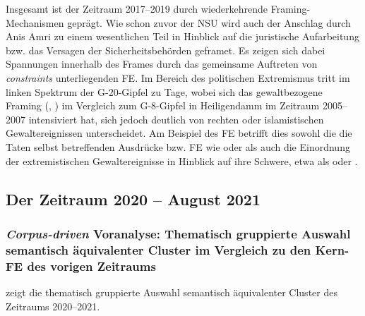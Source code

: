 Insgesamt ist der Zeitraum 2017--2019 durch wiederkehrende Framing-Mechanis\-men geprägt. Wie schon zuvor der NSU wird auch der Anschlag durch Anis Amri zu einem wesentlichen Teil in Hinblick auf die juristische Aufarbeitung bzw. das Versagen der Sicherheitsbehörden geframet. Es zeigen sich dabei Spannungen innerhalb des Frames durch das gemeinsame Auftreten von \emph{constraints} unterliegenden FE. Im Bereich des politischen Extremismus tritt im linken Spektrum der G-20-Gipfel zu Tage, wobei sich das gewaltbezogene Framing (, ) im Vergleich zum G-8-Gipfel in Heiligendamm im Zeitraum 2005--2007 intensiviert hat, sich jedoch deutlich von rechten oder islamistischen Gewaltereignissen unterscheidet. Am Beispiel des FE  betrifft dies sowohl die die Taten selbst betreffenden Ausdrücke bzw. FE wie  oder  als auch die Einordnung der extremistischen Gewaltereignisse in Hinblick auf ihre Schwere, etwa als  oder .

\subsection{Der Zeitraum 2020 -- August 2021}\label{der-zeitraum-2020-august-2021}

\subsubsection{\texorpdfstring{\emph{Corpus-driven} Voranalyse: Thematisch gruppierte Auswahl semantisch äquivalenter Cluster im Vergleich zu den Kern-FE des vorigen Zeitraums}{Corpus-driven Voranalyse: Thematisch gruppierte Auswahl semantisch äquivalenter Cluster im Vergleich zu den Kern-FE des vorigen Zeitraums}}\label{corpus-driven-voranalyse-thematisch-gruppierte-auswahl-semantisch-aequivalenter-cluster-im-vergleich-zu-den-kern-fe-des-vorigen-zeitraums-6}

 zeigt die thematisch gruppierte Auswahl semantisch äquivalenter Cluster des Zeitraums 2020--2021.

